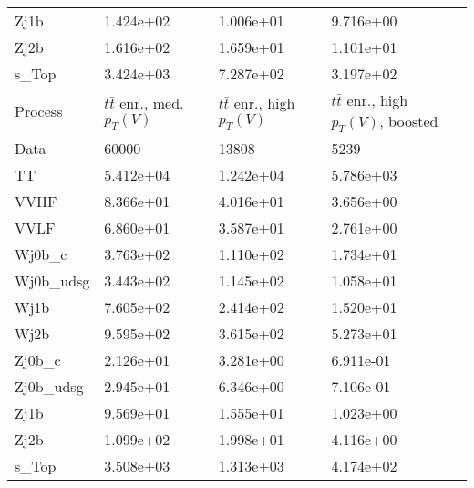\begin{table}
{\begin{tabularx}{0.8\textwidth}{|X|X|X|X|}
Zj1b & 1.424e+02 & 1.006e+01 & 9.716e+00 \\
Zj2b & 1.616e+02 & 1.659e+01 & 1.101e+01 \\
s\_Top & 3.424e+03 & 7.287e+02 & 3.197e+02 \\
\hline
\hline
Process & $t\bar{t}$ enr., med. $p_{T}(V)$ & $t\bar{t}$ enr., high $p_{T}(V)$ & $t\bar{t}$ enr., high $p_{T}(V)$, boosted \\
\hline
Data & 60000 & 13808 & 5239 \\
\hline
TT & 5.412e+04 & 1.242e+04 & 5.786e+03 \\
VVHF & 8.366e+01 & 4.016e+01 & 3.656e+00 \\
VVLF & 6.860e+01 & 3.587e+01 & 2.761e+00 \\
Wj0b\_c & 3.763e+02 & 1.110e+02 & 1.734e+01 \\
Wj0b\_udsg & 3.443e+02 & 1.145e+02 & 1.058e+01 \\
Wj1b & 7.605e+02 & 2.414e+02 & 1.520e+01 \\
Wj2b & 9.595e+02 & 3.615e+02 & 5.273e+01 \\
Zj0b\_c & 2.126e+01 & 3.281e+00 & 6.911e-01 \\
Zj0b\_udsg & 2.945e+01 & 6.346e+00 & 7.106e-01 \\
Zj1b & 9.569e+01 & 1.555e+01 & 1.023e+00 \\
Zj2b & 1.099e+02 & 1.998e+01 & 4.116e+00 \\
s\_Top & 3.508e+03 & 1.313e+03 & 4.174e+02 \\
\hline
\end{tabularx}
}
\label{tab:cr-Wmn-2017}
\end{table}

